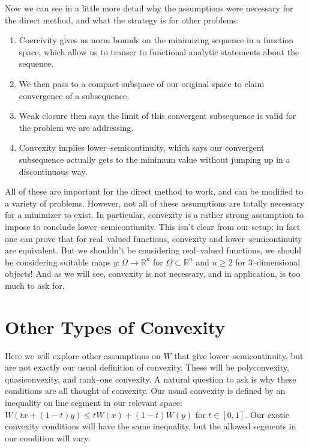 \documentclass[../main.tex]{subfiles}
\begin{document}
Now we can see in a little more detail why the assumptions were necessary for the direct method, and what the strategy is for other problems:

\begin{enumerate}
\item Coercivity gives us norm bounds on the minimizing sequence in a function space, which allow us to transer to functional analytic statements about the sequence.
\item We then pass to a compact subspace of our original space to claim convergence of a subsequence.
\item Weak closure then says the limit of this convergent subsequence is valid for the problem we are addressing.
\item Convexity implies lower--semicontinuity, which says our convergent subsequence actually gets to the minimum value without jumping up in a discontinuous way.
\end{enumerate}


All of these are important for the direct method to work, and can be modified to a variety of problems.
However, not all of these assumptions are totally necessary for a minimizer to exist.
In particular, convexity is a rather strong assumption to impose to conclude lower--semicontinuity.
This isn't clear from our setup; in fact one can prove that for real--valued functions, convexity and lower--semicontinuity are equivalent.
But we shouldn't be considering real--valued functions, we should be considering suitable maps $y: \Omega \to \mathbb{R}^n$ for $\Omega \subset \mathbb{R}^n$ and $n \geq 2$ for 3--dimensional objects!
And as we will see, convexity is not necessary, and in application, is too much to ask for.

\section{Other Types of Convexity}

Here we will explore other assumptions on $W$ that give lower--semicontinuity, but are not exactly our usual definition of convexity.
These will be polyconvexity, quasiconvexity, and rank--one convexity.
A natural question to ask is why these conditions are all thought of convexity.
Our usual convexity is defined by an inequality on line segment in our relevant space: $W(tx + (1-t)y) \leq t W(x) + (1-t) W(y)$ for $t \in [0,1]$.
Our exotic convexity conditions will have the same inequality, but the allowed segments in our condition will vary. \\
\end{document}
